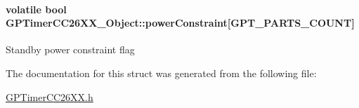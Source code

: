 \paragraph[{power\+Constraint}]{\setlength{\rightskip}{0pt plus 5cm}volatile bool G\+P\+Timer\+C\+C26\+X\+X\+\_\+\+Object\+::power\+Constraint\mbox{[}{\bf G\+P\+T\+\_\+\+P\+A\+R\+T\+S\+\_\+\+C\+O\+U\+N\+T}\mbox{]}}\label{struct_g_p_timer_c_c26_x_x___object_a780da20c760fc5ff1d9dca2cc63efeca}
Standby power constraint flag 

The documentation for this struct was generated from the following file\+:\begin{DoxyCompactItemize}
\item 
\hyperlink{_g_p_timer_c_c26_x_x_8h}{G\+P\+Timer\+C\+C26\+X\+X.\+h}\end{DoxyCompactItemize}
